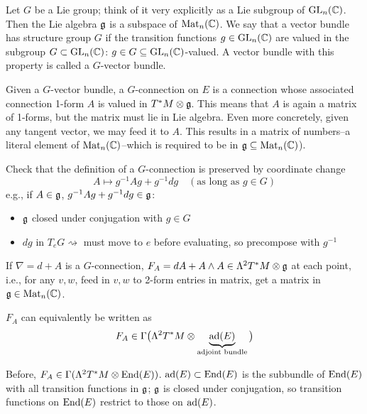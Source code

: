 \documentclass[main]{subfiles}
\begin{document}
\begin{definition}
	Let $G$ be a Lie group; think of it very explicitly as a Lie subgroup of $\operatorname{GL}_n(\mathbb C)$. Then the Lie algebra $\mathfrak{g}$ is a subspace of $\operatorname{Mat}_n(\mathbb C)$.
We say that a vector bundle has structure group $G$ if the transition functions $g \in \operatorname{GL}_n(\mathbb C)$ are valued in the subgroup $G \subset \operatorname{GL}_n(\mathbb C)$: $g \in G \subseteq \operatorname{GL}_n(\mathbb C)$-valued. A vector bundle with this property is called a $G$-vector bundle.
\end{definition}
\begin{definition}[$G$-connection]
	Given a $G$-vector bundle, a $G$-connection on $E$ is a connection whose associated connection 1-form $A$ is valued in $T^\ast M \otimes \mathfrak{g}$. 
	This means that $A$ is again a matrix of 1-forms, but the matrix must lie in Lie algebra.
	Even more concretely, given any tangent vector, we may feed it to $A$. This results in a matrix of numbers--a literal element of $\operatorname{Mat}_n(\mathbb C)$--which is required to be in $\mathfrak{g} \subseteq \operatorname{Mat}_n(\mathbb C)$).

\end{definition}


\begin{exercise}
Check that the definition of a $G$-connection is preserved by coordinate change
\[
A \mapsto g^{-1}Ag + g^{-1}dg \quad (\text{as long as } g \in G)
\]
e.g., if $A \in \mathfrak{g}$, $g^{-1}Ag + g^{-1}dg \in \mathfrak{g}$:
\begin{itemize}
	\item[$\hookrightarrow$] $\mathfrak{g}$ closed under conjugation with $g \in G$
	\item[$\hookrightarrow$] $dg$ in $T_e G \rightsquigarrow$ must move to $e$ before evaluating, so precompose with $g^{-1}$
\end{itemize}
\end{exercise}

\begin{exercise}
If $\nabla = d+A$ is a $G$-connection, $F_A = dA + A\wedge A \in \Lambda^2 T^\ast M \otimes \mathfrak{g}$ at each point, i.e., for any $v,w$, feed in $v,w$ to 2-form entries in matrix, get a matrix in $\mathfrak{g} \in \operatorname{Mat}_n(\mathbb C)$.
\end{exercise}

$F_A$ can equivalently be written as
\[
F_A \in \Gamma\big(\Lambda^2 T^\ast M \otimes \underbrace{\operatorname{ad}(E)}_{\text{adjoint bundle}}\big)
\]

Before, $F_A \in \Gamma(\Lambda^2 T^\ast M \otimes \operatorname{End}(E))$. $\operatorname{ad}(E) \subset \operatorname{End}(E)$ is the subbundle of $\operatorname{End}(E)$ with all transition functions in $\mathfrak{g}$; $\mathfrak{g}$ is closed under conjugation, so transition functions on $\operatorname{End}(E)$ restrict to those on $\operatorname{ad}(E)$.
\end{document}
